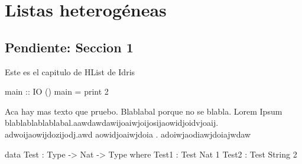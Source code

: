 
\chapter{Listas heterogéneas}
\label{ch:1}

\section{Pendiente: Seccion 1}
\begin{fullwidth}

Este es el capitulo de HList de Idris \cite{Kiselyov:2004:STH:1017472.1017488}
\end{fullwidth}

\begin{code}
main  ::  IO ()
main  =   print 2
\end{code}

Aca hay mas texto que pruebo. Blablabal porque no se blabla. Lorem Ipsum blablablablablabal.aawdawdawijoaiwjoijosijaowidjoidvjoaij. adwoijaowijdozijodj.awd aowidjoaiwjdoia . adoiwjaodiawjdoiajwdaw

\begin{code}
data Test : Type -> Nat -> Type where
    Test1 : Test Nat 1
    Test2 : Test String 2
\end{code}
